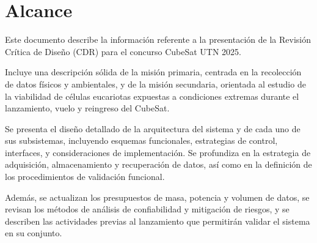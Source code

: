 \chapter{Alcance} Este documento describe la información referente a la presentación de la Revisión Crítica de Diseño
(CDR) para el concurso CubeSat UTN 2025.

Incluye una descripción sólida de la misión primaria, centrada en la recolección de datos físicos y ambientales, y de la
misión secundaria, orientada al estudio de la viabilidad de células eucariotas expuestas a condiciones extremas durante
el lanzamiento, vuelo y reingreso del CubeSat.

Se presenta el diseño detallado de la arquitectura del sistema y de cada uno de sus subsistemas, incluyendo esquemas
funcionales, estrategias de control, interfaces, y consideraciones de implementación.  Se profundiza en la estrategia de
adquisición, almacenamiento y recuperación de datos, así como en la definición de los procedimientos de
validación funcional.

Además, se actualizan los presupuestos de masa, potencia y volumen de datos, se revisan los métodos de análisis de
confiabilidad y mitigación de riesgos, y se describen las actividades previas al lanzamiento que permitirán validar el
sistema en su conjunto.
